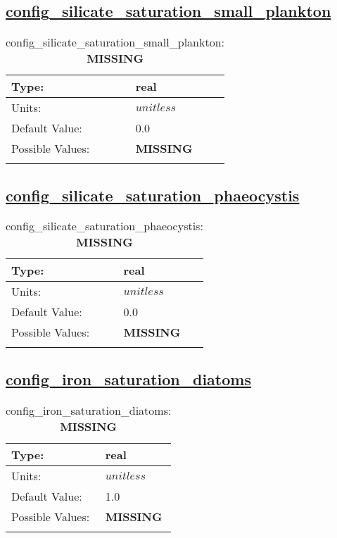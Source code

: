 \subsection[config\_silicate\_saturation\_small\_plankton]{\hyperref[sec:nm_tab_biogeochemistry]{config\_silicate\_saturation\_small\_plankton}}
\label{subsec:nm_sec_config_silicate_saturation_small_plankton}
\begin{center}
\begin{longtable}{| p{2.0in} || p{4.0in} |}
    \hline
    Type: & real \\
    \hline
    Units: & $unitless$ \\
    \hline
    Default Value: & 0.0 \\
    \hline
    Possible Values: & {\bf \color{red} MISSING} \\
    \hline
    \caption{config\_silicate\_saturation\_small\_plankton: {\bf \color{red} MISSING}}
\end{longtable}
\end{center}
\subsection[config\_silicate\_saturation\_phaeocystis]{\hyperref[sec:nm_tab_biogeochemistry]{config\_silicate\_saturation\_phaeocystis}}
\label{subsec:nm_sec_config_silicate_saturation_phaeocystis}
\begin{center}
\begin{longtable}{| p{2.0in} || p{4.0in} |}
    \hline
    Type: & real \\
    \hline
    Units: & $unitless$ \\
    \hline
    Default Value: & 0.0 \\
    \hline
    Possible Values: & {\bf \color{red} MISSING} \\
    \hline
    \caption{config\_silicate\_saturation\_phaeocystis: {\bf \color{red} MISSING}}
\end{longtable}
\end{center}
\subsection[config\_iron\_saturation\_diatoms]{\hyperref[sec:nm_tab_biogeochemistry]{config\_iron\_saturation\_diatoms}}
\label{subsec:nm_sec_config_iron_saturation_diatoms}
\begin{center}
\begin{longtable}{| p{2.0in} || p{4.0in} |}
    \hline
    Type: & real \\
    \hline
    Units: & $unitless$ \\
    \hline
    Default Value: & 1.0 \\
    \hline
    Possible Values: & {\bf \color{red} MISSING} \\
    \hline
    \caption{config\_iron\_saturation\_diatoms: {\bf \color{red} MISSING}}
\end{longtable}
\end{center}
